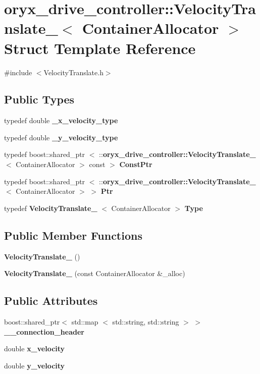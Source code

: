 \section{oryx\-\_\-drive\-\_\-controller\-:\-:\-Velocity\-Translate\-\_\-$<$ \-Container\-Allocator $>$ \-Struct \-Template \-Reference}
\label{structoryx__drive__controller_1_1VelocityTranslate__}


{\ttfamily \#include $<$\-Velocity\-Translate.\-h$>$}

\subsection*{\-Public \-Types}
\begin{DoxyCompactItemize}
\item 
typedef double {\bf \-\_\-x\-\_\-velocity\-\_\-type}
\item 
typedef double {\bf \-\_\-y\-\_\-velocity\-\_\-type}
\item 
typedef boost\-::shared\-\_\-ptr\*
$<$ \-::{\bf oryx\-\_\-drive\-\_\-controller\-::\-Velocity\-Translate\-\_\-}\*
$<$ \-Container\-Allocator $>$ const  $>$ {\bf \-Const\-Ptr}
\item 
typedef boost\-::shared\-\_\-ptr\*
$<$ \-::{\bf oryx\-\_\-drive\-\_\-controller\-::\-Velocity\-Translate\-\_\-}\*
$<$ \-Container\-Allocator $>$ $>$ {\bf \-Ptr}
\item 
typedef {\bf \-Velocity\-Translate\-\_\-}\*
$<$ \-Container\-Allocator $>$ {\bf \-Type}
\end{DoxyCompactItemize}
\subsection*{\-Public \-Member \-Functions}
\begin{DoxyCompactItemize}
\item 
{\bf \-Velocity\-Translate\-\_\-} ()
\item 
{\bf \-Velocity\-Translate\-\_\-} (const \-Container\-Allocator \&\-\_\-alloc)
\end{DoxyCompactItemize}
\subsection*{\-Public \-Attributes}
\begin{DoxyCompactItemize}
\item 
boost\-::shared\-\_\-ptr$<$ std\-::map\*
$<$ std\-::string, std\-::string $>$ $>$ {\bf \-\_\-\-\_\-connection\-\_\-header}
\item 
double {\bf x\-\_\-velocity}
\item 
double {\bf y\-\_\-velocity}
\end{DoxyCompactItemize}


